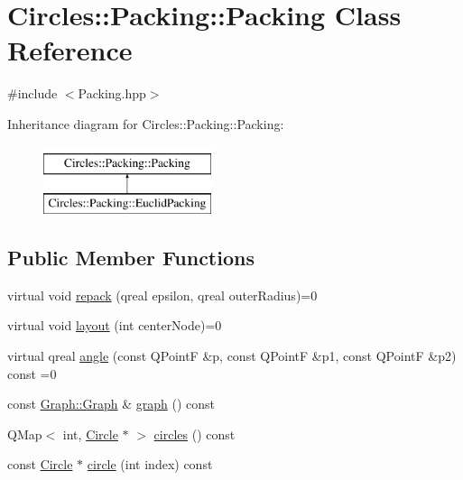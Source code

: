 \hypertarget{class_circles_1_1_packing_1_1_packing}{}\section{Circles\+:\+:Packing\+:\+:Packing Class Reference}
\label{class_circles_1_1_packing_1_1_packing}


{\ttfamily \#include $<$Packing.\+hpp$>$}

Inheritance diagram for Circles\+:\+:Packing\+:\+:Packing\+:\begin{figure}[H]
\begin{center}
\leavevmode
\includegraphics[height=2.000000cm]{class_circles_1_1_packing_1_1_packing}
\end{center}
\end{figure}
\subsection*{Public Member Functions}
\begin{DoxyCompactItemize}
\item 
virtual void \hyperlink{class_circles_1_1_packing_1_1_packing_a368eba2c988e6d42f6b9b41a17126121}{repack} (qreal epsilon, qreal outer\+Radius)=0
\item 
virtual void \hyperlink{class_circles_1_1_packing_1_1_packing_aad695ed5f3341f75ea7b2b4135203a7f}{layout} (int center\+Node)=0
\item 
virtual qreal \hyperlink{class_circles_1_1_packing_1_1_packing_a41991c2ef4010416fb382ae4e180e7ee}{angle} (const Q\+Point\+F \&p, const Q\+Point\+F \&p1, const Q\+Point\+F \&p2) const  =0
\item 
const \hyperlink{class_circles_1_1_graph_1_1_graph}{Graph\+::\+Graph} \& \hyperlink{class_circles_1_1_packing_1_1_packing_ab1da9320813d23d0b24e3ad67dcd6b03}{graph} () const 
\item 
Q\+Map$<$ int, \hyperlink{class_circles_1_1_packing_1_1_circle}{Circle} $\ast$ $>$ \hyperlink{class_circles_1_1_packing_1_1_packing_a6dec25e7a0fc0fee6e1f3fb7856a7867}{circles} () const 
\item 
const \hyperlink{class_circles_1_1_packing_1_1_circle}{Circle} $\ast$ \hyperlink{class_circles_1_1_packing_1_1_packing_ab4c423f23c7859f6c6fc93b0b2f2462c}{circle} (int index) const 
\end{DoxyCompactItemize}
